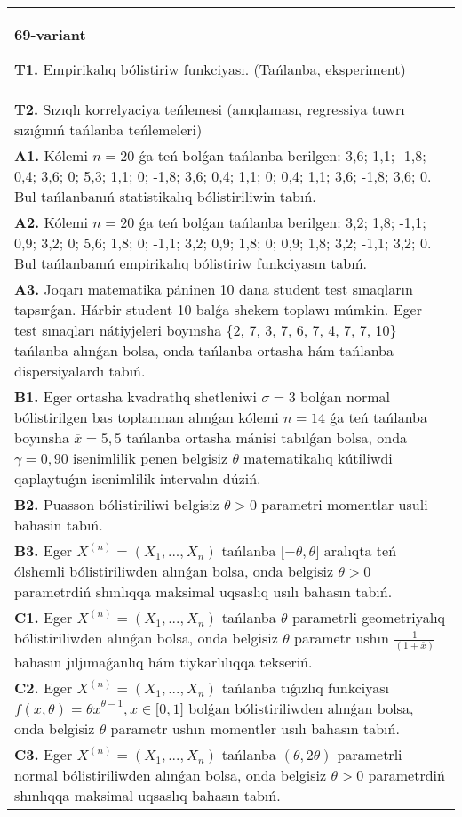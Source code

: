 \documentclass{article}
\begin{document}
\begin{tabular}{m{17cm}}
\textbf{69-variant}
\newline

\textbf{T1.} 
Empirikalıq bólistiriw funkciyası. (Tańlanba, eksperiment)
 \\
\textbf{T2.} 
Sızıqlı korrelyaciya teńlemesi (anıqlaması, regressiya tuwrı sızıǵınıń tańlanba teńlemeleri)
 \\
\textbf{A1.} 
Kólemi \(n = 20\) ǵa teń bolǵan tańlanba berilgen: 3,6; 1,1; -1,8; 0,4; 3,6; 0; 5,3; 1,1; 0; -1,8; 3,6; 0,4; 1,1; 0; 0,4; 1,1; 3,6; -1,8; 3,6; 0. Bul tańlanbanıń statistikalıq bólistiriliwin tabıń.
 \\
\textbf{A2.} 
Kólemi \(n = 20\) ǵa teń bolǵan tańlanba berilgen: 3,2; 1,8; -1,1; 0,9; 3,2; 0; 5,6; 1,8; 0; -1,1; 3,2; 0,9; 1,8; 0; 0,9; 1,8; 3,2; -1,1; 3,2; 0. Bul tańlanbanıń empirikalıq bólistiriw funkciyasın tabıń.
 \\
\textbf{A3.} 
Joqarı matematika páninen 10 dana student test sınaqların tapsırǵan. Hárbir student 10 balǵa shekem toplawı múmkin. Eger test sınaqları nátiyjeleri boyınsha \{2, 7, 3, 7, 6, 7, 4, 7, 7, 10\} tańlanba alınǵan bolsa, onda tańlanba ortasha hám tańlanba dispersiyalardı tabıń.
 \\
\textbf{B1.} 
Eger ortasha kvadratlıq shetleniwi \(\sigma = 3\) bolǵan normal bólistirilgen bas toplamnan alınǵan kólemi \(n = 14\) ǵa teń tańlanba boyınsha \(\overline{x} = 5,5\) tańlanba ortasha mánisi tabılǵan bolsa, onda \(\gamma = 0,90\) isenimlilik penen belgisiz \(\theta\) matematikalıq kútiliwdi qaplaytuǵın isenimlilik intervalın dúziń.
 \\
\textbf{B2.} 
Puasson bólistiriliwi belgisiz \(\theta > 0\) parametri momentlar usuli bahasin tabıń.
 \\
\textbf{B3.} 
Eger \(X^{(n)} = \left( X_{1},...,X_{n} \right)\) tańlanba \(\lbrack - \theta,\theta\rbrack\) aralıqta teń ólshemli bólistiriliwden alınǵan bolsa, onda belgisiz \(\theta > 0\) parametrdiń shınlıqqa maksimal uqsaslıq usılı bahasın tabıń.
 \\
\textbf{C1.} 
Eger \(X^{(n)} = \left( X_{1},...,X_{n} \right)\) tańlanba \(\theta\) parametrli geometriyalıq bólistiriliwden alınǵan bolsa, onda belgisiz \(\theta\) parametr ushın \(\frac{1}{(1 + \overline{x})}\) bahasın jıljımaǵanlıq hám tiykarlılıqqa tekseriń.
 \\
\textbf{C2.} 
Eger \(X^{(n)} = \left( X_{1},...,X_{n} \right)\) tańlanba tıǵızlıq funkciyası
${f(x,\theta) = \theta x}^{\theta - 1},x \in \lbrack 0,1\rbrack$
bolǵan bólistiriliwden alınǵan bolsa, onda belgisiz \(\theta\) parametr ushın momentler usılı bahasın tabıń.
 \\
\textbf{C3.} 
Eger \(X^{(n)} = \left( X_{1},...,X_{n} \right)\) tańlanba \((\theta,2\theta)\) parametrli normal bólistiriliwden alınǵan bolsa, onda belgisiz \(\theta > 0\) parametrdiń shınlıqqa maksimal uqsaslıq bahasın tabıń.
 \\

\end{tabular}
\vspace{1cm}
\end{document}
